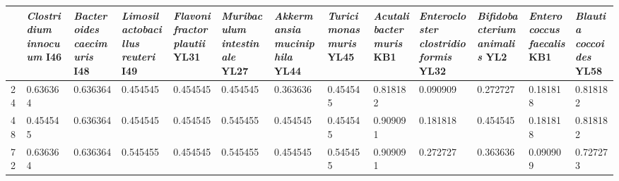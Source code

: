 \begin{tabular}{lllllllllllll}
\toprule
{} & \emph{Clostridium innocuum} I46 & \emph{Bacteroides caecimuris} I48 & \emph{Limosilactobacillus reuteri} I49 & \emph{Flavonifractor plautii} YL31 & \emph{Muribaculum intestinale} YL27 & \emph{Akkermansia muciniphila} YL44 & \emph{Turicimonas muris} YL45 & \emph{Acutalibacter muris} KB1 &  \emph{Enterocloster clostridioformis} YL32 &  \emph{Bifidobacterium animalis} YL2 &  \emph{Enterococcus faecalis} KB1 &  \emph{Blautia coccoides} YL58 \\
\midrule
24 &                 0.636364 &                   0.636364 &                        0.454545 &                    0.454545 &                     0.454545 &                    0.363636 &               0.454545 &                0.818182 &                            0.090909 &                     0.272727 &                  0.181818 &               0.818182 \\
48 &                 0.454545 &                   0.636364 &                        0.454545 &                    0.454545 &                     0.545455 &                    0.454545 &               0.454545 &                0.909091 &                            0.181818 &                     0.454545 &                  0.181818 &               0.818182 \\
72 &                 0.636364 &                   0.636364 &                        0.545455 &                    0.454545 &                     0.545455 &                    0.454545 &               0.545455 &                0.909091 &                            0.272727 &                     0.363636 &                  0.090909 &               0.727273 \\
\bottomrule
\end{tabular}
